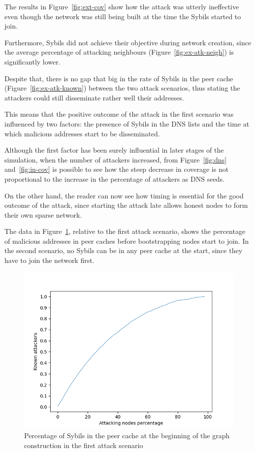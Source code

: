 The results in Figure~\ref{fig:ext-cov} show how the attack was utterly ineffective even though the network was still being built at the time the Sybils started to join.
 
Furthermore, Sybils did not achieve their objective during network creation, since the average percentage of attacking neighbours (Figure~\ref{fig:ex-atk-neigh}) is significantly lower.

Despite that, there is no gap that big in the rate of Sybils in the peer cache (Figure~\ref{fig:ex-atk-known}) between the two attack scenarios, thus stating the attackers could still disseminate rather well their addresses.

This means that the positive outcome of the attack in the first scenario was influenced by two factors: the presence of Sybils in the DNS lists and the time at which malicious addresses start to be disseminated.

Although the first factor has been surely influential in later stages of the simulation, when the number of attackers increased, from Figure~\ref{fig:dns} and~\ref{fig:in-cov} is possible to see how the steep decrease in coverage is not proportional to the increase in the percentage of attackers as DNS seeds.

On the other hand, the reader can now see how timing is essential for the good outcome of the attack, since starting the attack late allows honest nodes to form their own sparse network.

The data in Figure~\ref{fig:beginning}, relative to the first attack scenario, shows the percentage of malicious addresses in peer caches before bootstrapping nodes start to join. In the second scenario, no Sybils can be in any peer cache at the start, since they have to join the network first.\par

\begin{figure}[h!]
	\includegraphics[width=.7\textwidth]{pict/results/in-atkknown-beginning.png}
	\centering
	\caption{Percentage of Sybils in the peer cache at the beginning of the graph construction in the first attack scenario}
	\label{fig:beginning}
\end{figure}

